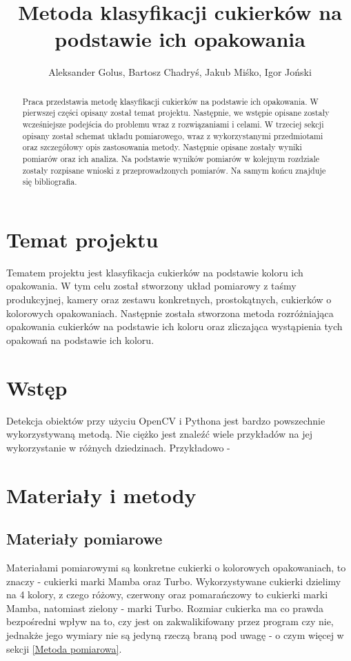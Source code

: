\documentclass{article}
\title{Metoda klasyfikacji cukierków na podstawie ich opakowania}
\author{Aleksander Golus, Bartosz Chadryś, Jakub Miśko, Igor Joński}
\begin{document}
\maketitle

\begin{abstract}
Praca przedstawia metodę klasyfikacji cukierków na podstawie ich opakowania. W pierwszej części opisany został temat projektu. Następnie, we wstępie opisane zostały wcześniejsze podejścia do problemu wraz z rozwiązaniami i celami. W trzeciej sekcji opisany został schemat układu pomiarowego, wraz z wykorzystanymi przedmiotami oraz szczegółowy opis zastosowania metody. Następnie opisane zostały wyniki pomiarów oraz ich analiza. Na podstawie wyników pomiarów w kolejnym rozdziale zostały rozpisane wnioski z przeprowadzonych pomiarów. Na samym końcu znajduje się bibliografia.
\end{abstract}

\section{Temat projektu}
Tematem projektu jest klasyfikacja cukierków na podstawie koloru ich opakowania. W tym celu został stworzony układ pomiarowy z taśmy produkcyjnej, kamery oraz zestawu konkretnych, prostokątnych, cukierków o kolorowych opakowaniach. Następnie została stworzona metoda rozróżniająca opakowania cukierków na podstawie ich koloru oraz zliczająca wystąpienia tych opakowań na podstawie ich koloru.

\section{Wstęp}
Detekcja obiektów przy użyciu OpenCV i Pythona jest bardzo powszechnie wykorzystywaną metodą. Nie ciężko jest znaleźć wiele przykładów na jej wykorzystanie w różnych dziedzinach. Przykładowo -

\section{Materiały i metody}
\subsection{Materiały pomiarowe}
Materiałami pomiarowymi są konkretne cukierki o kolorowych opakowaniach, to znaczy - cukierki marki Mamba oraz Turbo. Wykorzystywane cukierki dzielimy na 4 kolory, z czego różowy, czerwony oraz pomarańczowy to cukierki marki Mamba, natomiast zielony - marki Turbo. Rozmiar cukierka ma co prawda bezpośredni wpływ na to, czy jest on zakwalikifowany przez program czy nie, jednakże jego wymiary nie są jedyną rzeczą braną pod uwagę - o czym więcej w sekcji \ref{Metoda pomiarowa}.
\end{document}
